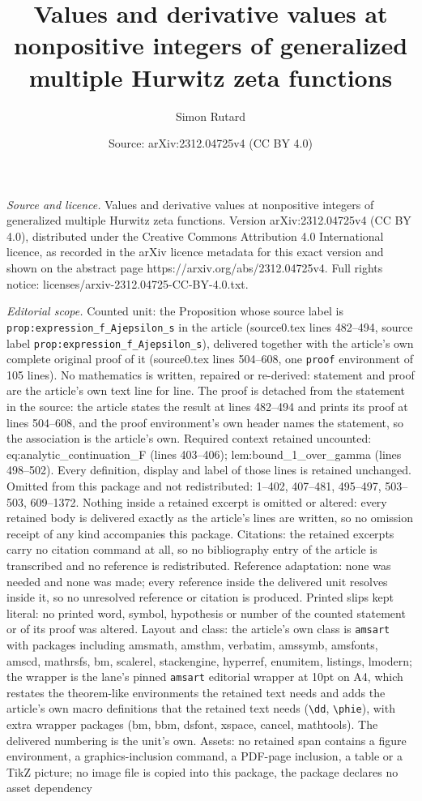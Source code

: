 \documentclass[10pt,a4paper]{amsart}
\title[Values and derivative values at nonpositive integers of gene]{Values and derivative values at nonpositive integers of generalized multiple Hurwitz zeta functions}
\author{Simon Rutard}
\date{Source: arXiv:2312.04725v4 (CC BY 4.0)}
\begin{document}
\maketitle

\noindent\emph{Source and licence.} Values and derivative values at nonpositive integers of generalized multiple Hurwitz zeta functions. Version arXiv:2312.04725v4 (CC BY 4.0), distributed under the Creative Commons Attribution 4.0 International licence, as recorded in the arXiv licence metadata for this exact version and shown on the abstract page https://arxiv.org/abs/2312.04725v4. Full rights notice: licenses/arxiv-2312.04725-CC-BY-4.0.txt.\par\smallskip

\noindent\textit{Editorial scope.} Counted unit: the Proposition whose source label is \texttt{prop:expression\_f\_Ajepsilon\_s} in the article (source0.tex lines 482--494, source label \texttt{prop:expression\_f\_Ajepsilon\_s}), delivered together with the article's own complete original proof of it (source0.tex lines 504--608, one \texttt{proof} environment of 105 lines). No mathematics is written, repaired or re-derived: statement and proof are the article's own text line for line. The proof is detached from the statement in the source: the article states the result at lines 482--494 and prints its proof at lines 504--608, and the proof environment's own header names the statement, so the association is the article's own. Required context retained uncounted: eq:analytic\_continuation\_F (lines 403--406); lem:bound\_1\_over\_gamma (lines 498--502). Every definition, display and label of those lines is retained unchanged. Omitted from this package and not redistributed: 1--402, 407--481, 495--497, 503--503, 609--1372. Nothing inside a retained excerpt is omitted or altered: every retained body is delivered exactly as the article's lines are written, so no omission receipt of any kind accompanies this package. Citations: the retained excerpts carry no citation command at all, so no bibliography entry of the article is transcribed and no reference is redistributed. Reference adaptation: none was needed and none was made; every reference inside the delivered unit resolves inside it, so no unresolved reference or citation is produced. Printed slips kept literal: no printed word, symbol, hypothesis or number of the counted statement or of its proof was altered. Layout and class: the article's own class is \texttt{amsart} with packages including amsmath, amsthm, verbatim, amssymb, amsfonts, amscd, mathrsfs, bm, scalerel, stackengine, hyperref, enumitem, listings, lmodern; the wrapper is the lane's pinned \texttt{amsart} editorial wrapper at 10pt on A4, which restates the theorem-like environments the retained text needs and adds the article's own macro definitions that the retained text needs (\texttt{\textbackslash dd}, \texttt{\textbackslash phie}), with extra wrapper packages (bm, bbm, dsfont, xspace, cancel, mathtools). The delivered numbering is the unit's own. Assets: no retained span contains a figure environment, a graphics-inclusion command, a PDF-page inclusion, a table or a TikZ picture; no image file is copied into this package, the package declares no asset dependency 
\end{document}
